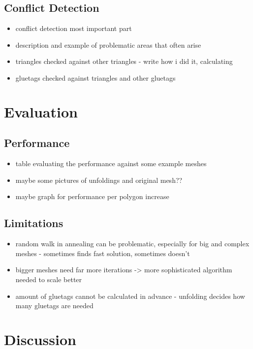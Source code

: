 \documentclass[draft,final]{vutinfth} %
\begin{document}
\section{Conflict Detection}

\begin{itemize}
	\item conflict detection most important part
	\item description and example of problematic areas that often arise
	\item triangles checked against other triangles - write how i did it, calculating 
	\item gluetags checked against triangles and other gluetags
\end{itemize}

\chapter{Evaluation}

\section{Performance}

\begin{itemize}
	\item table evaluating the performance against some example meshes
	\item maybe some pictures of unfoldings and original mesh??
	\item maybe graph for performance per polygon increase
\end{itemize}

\section{Limitations}

\begin{itemize}
	\item random walk in annealing can be problematic, especially for big and complex meshes - sometimes finds fast solution, sometimes doesn't
	\item bigger meshes need far more iterations -> more sophisticated algorithm needed to scale better
	\item amount of gluetags cannot be calculated in advance - unfolding decides how many gluetags are needed
\end{itemize}

\chapter{Discussion}
\end{document}
